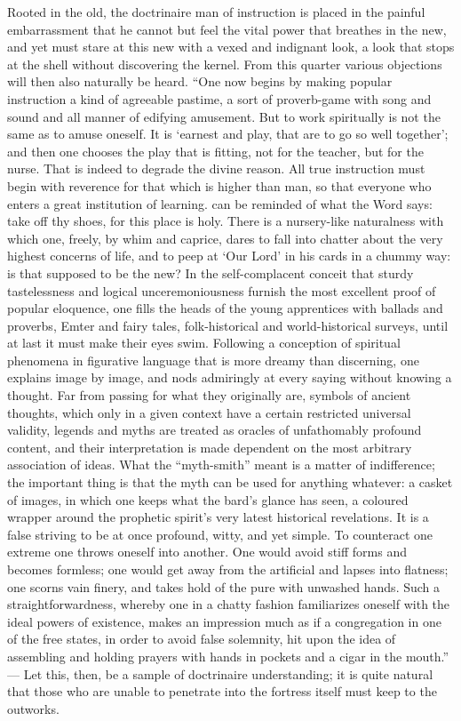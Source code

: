 \documentclass[12pt,a4paper,openany]{book}
\newcommand{\opage}[1]{\marginnote{\footnotesize\textit{[#1]}}}
\begin{document}
Rooted in the old, the doctrinaire man of instruction
is placed in the painful embarrassment that he
\setcounter{footnote}{0}%
\opage{410}cannot but feel the vital power that breathes in the new, and
yet must stare at this new with a vexed and indignant
look, a look that stops at the shell without
discovering the kernel. From this quarter various objections
will then also naturally be heard. ``One now begins
by making popular instruction a kind of agreeable
pastime, a sort of proverb-game with song and
sound and all manner of edifying amusement. But to work
spiritually is not the same as to amuse oneself. It is
`earnest and play, that are to go so well together'; and then one chooses the play that is fitting,
not for the teacher, but for the nurse. That is indeed to degrade
the divine reason. All true instruction
must begin with reverence for that which is
higher than man, so that everyone who enters
a great institution of learning. can be reminded of what the Word says: %
take off thy shoes, for this place is holy. There is a
nursery-like naturalness with which one, freely, by whim
and caprice, dares to fall into chatter about the very highest
concerns of life, and to peep at `Our Lord' in his cards in a chummy way:
is that supposed to be the new? In the self-complacent
conceit that sturdy tastelessness and logical unceremoniousness
furnish the most excellent proof of popular eloquence,
one fills the heads of the young apprentices with ballads
and proverbs, Emter and fairy tales, folk-historical and world-historical %
surveys, until at last it must make their eyes
swim. Following a conception of spiritual phenomena in
figurative language that is more dreamy than discerning,
one explains image by image, and nods admiringly
at every saying without knowing a thought.
Far from passing for what they originally are,
\setcounter{footnote}{0}%
\opage{411}symbols of ancient thoughts, which only in a given context
have a certain restricted universal validity, legends
and myths are treated as oracles of unfathomably
profound content, and their interpretation is made dependent on
the most arbitrary association of ideas. What the ``myth-smith''
meant is a matter of indifference; the important thing is that
the myth can be used for anything whatever: a casket of images,
in which one keeps what the bard's glance has seen, a
coloured wrapper around the prophetic spirit's very latest
historical revelations. It is a false striving
to be at once profound, witty, and yet simple.
To counteract one extreme one throws oneself
into another. One would avoid stiff forms
and becomes formless; one would get away from the artificial
and lapses into flatness; one scorns vain finery,
and takes hold of the pure with unwashed hands. Such
a straightforwardness, whereby one in a chatty fashion familiarizes
oneself with the ideal powers of existence, makes an impression
much as if a congregation in one of the free states,
in order to avoid false solemnity, hit upon the idea of assembling
and holding prayers with hands in pockets and a cigar
in the mouth.'' --- Let this, then, be a sample of doctrinaire
understanding; it is quite natural that those
who are unable to penetrate into the fortress itself must
keep to the outworks.
\end{document}

